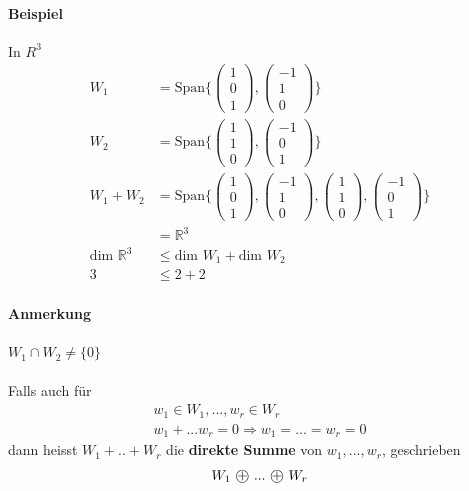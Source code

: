 \documentclass[11pt]{report}
\newcommand*\directsum{%
\text{ \textcircled{+} }
}
\newcommand*\Zb[1] {\mathbb{#1}}
\newcommand*\f[1] {\textbf{#1}}
\begin{document}
\paragraph{Beispiel}
In $R^3$
\begin{align}
 W_1 &= \text{Span}\{\begin{pmatrix} 1 \\ 0 \\ 1 \end{pmatrix}, \begin{pmatrix} -1 \\ 1 \\ 0 \end{pmatrix}\} \\
 W_2 &= \text{Span}\{\begin{pmatrix} 1 \\ 1 \\ 0 \end{pmatrix}, \begin{pmatrix} -1 \\ 0 \\ 1 \end{pmatrix}\} \\
 W_1 + W_2 &= \text{Span}\{\begin{pmatrix} 1 \\ 0 \\ 1 \end{pmatrix}, \begin{pmatrix} -1 \\ 1 \\ 0 \end{pmatrix}, \begin{pmatrix} 1 \\ 1 \\ 0 \end{pmatrix}, \begin{pmatrix} -1 \\ 0 \\ 1 \end{pmatrix}\} \\
&= \Zb{R}^3 \\
\text{dim } \Zb{R}^3 &\leq \text{dim } W_1 + \text{dim } W_2 \\
3 &\leq 2 + 2
\end{align}
\paragraph{Anmerkung} $W_1 \cap W_2 \neq \{0\}$\\\\
Falls auch für 
\begin{align}
 w_1 \in W_1, ..., w_r \in W_r \\
 w_1 + ... w_r = 0 \Rightarrow w_1 = ... = w_r = 0
\end{align}
dann heisst $W_1 + .. + W_r$ die \f{direkte Summe} von $w_1, ..., w_r$, geschrieben
\begin{align}
 W_1 \directsum ... \directsum W_r
\end{align}
\end{document}
